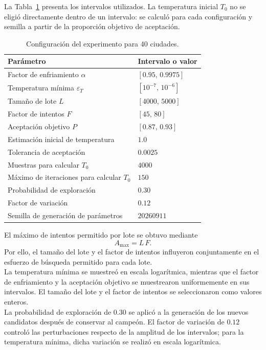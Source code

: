 \documentclass[12pt]{article}
\begin{document}
La Tabla~\ref{tab:parametros-experimento40} presenta los intervalos
utilizados. La temperatura inicial $T_0$ no se eligió directamente
dentro de un intervalo: se calculó para cada configuración y semilla
a partir de la proporción objetivo de aceptación.

\begin{table}[htbp]
    \centering
    \small
    \begin{tabular}{ll}
        \hline
        Parámetro & Intervalo o valor \\
        \hline
        Factor de enfriamiento $\alpha$ & $[0.95,\,0.9975]$ \\
        Temperatura mínima $\varepsilon_T$ & $[10^{-7},\,10^{-6}]$ \\
        Tamaño de lote $L$ & $[4000,\,5000]$ \\
        Factor de intentos $F$ & $[45,\,80]$ \\
        Aceptación objetivo $P$ & $[0.87,\,0.93]$ \\
        Estimación inicial de temperatura & $1.0$ \\
        Tolerancia de aceptación & $0.0025$ \\
        Muestras para calcular $T_0$ & $4000$ \\
        Máximo de iteraciones para calcular $T_0$ & $150$ \\
        Probabilidad de exploración & $0.30$ \\
        Factor de variación & $0.12$ \\
        Semilla de generación de parámetros & $20260911$ \\
        \hline
    \end{tabular}
    \caption{Configuración del experimento para 40 ciudades.}
    \label{tab:parametros-experimento40}
\end{table}
El máximo de intentos permitido por lote se obtuvo mediante
\[
    A_{\max}=L\,F.
\]
Por ello, el tamaño del lote y el factor de intentos influyeron
conjuntamente en el esfuerzo de búsqueda permitido para cada lote.
\\
La temperatura mínima se muestreó en escala logarítmica, mientras que
el factor de enfriamiento y la aceptación objetivo se muestrearon
uniformemente en sus intervalos. El tamaño del lote y el factor de
intentos se seleccionaron como valores enteros.
\\
La probabilidad de exploración de $0.30$ se aplicó a la generación de
los nuevos candidatos después de conservar al campeón. El factor de
variación de $0.12$ controló las perturbaciones respecto de la amplitud
de los intervalos; para la temperatura mínima, dicha variación se
realizó en escala logarítmica.
\end{document}
